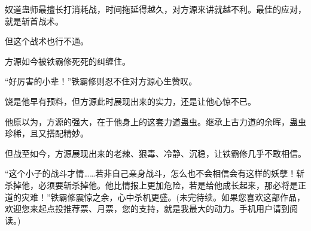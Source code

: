 \begin{this_body}
奴道蛊师最擅长打消耗战，时间拖延得越久，对方源来讲就越不利。最佳的应对，就是斩首战术。

但这个战术也行不通。

方源如今被铁霸修死死的纠缠住。

“好厉害的小辈！”铁霸修则忍不住对方源心生赞叹。

饶是他早有预料，但方源此时展现出来的实力，还是让他心惊不已。

他原以为，方源的强大，在于他身上的这套力道蛊虫。继承上古力道的余晖，蛊虫珍稀，且又搭配精妙。

但战至如今，方源展现出来的老辣、狠毒、冷静、沉稳，让铁霸修几乎不敢相信。

“这个小子的战斗才情……若非自己亲身战斗，怎么也不会相信会有这样的妖孽！斩杀掉他，必须要斩杀掉他。他比情报上更加危险，若是给他成长起来，那必将是正道的灾难！”铁霸修震惊之余，心中杀机更盛。(未完待续。如果您喜欢这部作品，欢迎您来起点投推荐票、月票，您的支持，就是我最大的动力。手机用户请到阅读。)

\end{this_body}

